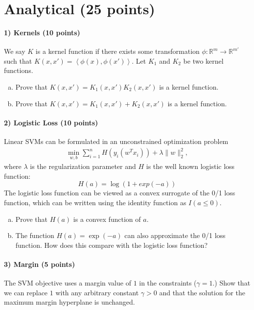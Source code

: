 \documentclass[11pt]{article}
\begin{document}
\section{Analytical (25 points)}

\paragraph{1) Kernels (10 points)}

We say $K$ is a kernel function if there exists some transformation $\phi:\mathbb{R}^m\rightarrow \mathbb{R}^{m'}$ such that $K(x,x') = \left<\phi(x),\phi(x')\right>$.
Let $K_1$ and $K_2$ be two kernel functions.
\begin{enumerate}[(a)]

\item Prove that $K(x,x') = K_1(x,x') K_2(x,x')$ is a kernel function.

\item Prove that $K(x,x') = K_1(x,x') + K_2(x,x')$ is a kernel function.

\end{enumerate}


\paragraph{2) Logistic Loss (10 points)} 


Linear SVMs can be formulated in an unconstrained optimization problem
\begin{align}\label{SVM}
\min_{w,b}\sum_{i=1}^n H(y_i(w^Tx_i)) + \lambda\|w\|_2^2,
\end{align}
where $\lambda$ is the regularization parameter and $H$ is the well known logistic loss function:
\[
H(a) = \log(1+ exp(-a))
\]
The logistic loss function can be viewed as a convex surrogate of the 0/1 loss function, which can be written using the identity function as $I(a \leq 0)$.
\begin{enumerate}[(a)]
\item Prove that $H(a)$ is a convex function of $a$.

\item The function $H(a) = \exp(-a)$ can also approximate the 0/1 loss function. How does this compare with the logistic loss function?

\end{enumerate}

\paragraph{3) Margin (5 points) }
The SVM objective uses a margin value of $1$ in the constraints ($\gamma=1$.) Show that we can replace $1$ with any arbitrary constant $\gamma > 0$ and that the solution for the maximum margin hyperplane is unchanged.
\end{document}
